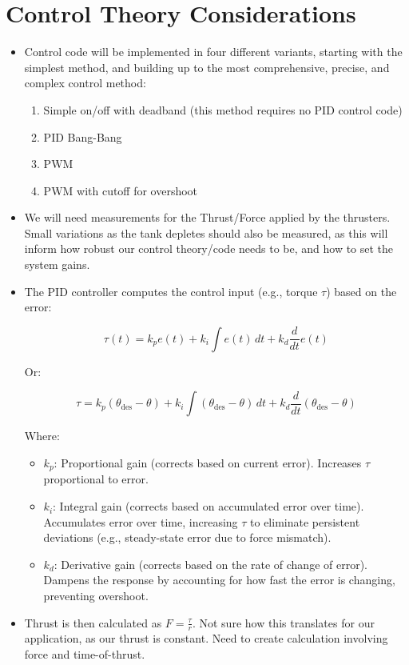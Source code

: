 \documentclass[11pt]{scrartcl}
\begin{document}
\section{Control Theory Considerations}

\begin{itemize}
	\item Control code will be implemented in four different variants, starting with the simplest method, and building up to the most comprehensive, precise, and complex control method:
	\begin{enumerate}
		\item Simple on/off with deadband (this method requires no PID control code)
		\item PID Bang-Bang 
		\item PWM
		\item PWM with cutoff for overshoot
	\end{enumerate}
	
	\item We will need measurements for the Thrust/Force applied by the thrusters. Small variations as the tank depletes should also be measured, as this will inform how robust our control theory/code needs to be, and how to set the system gains.
	
	\item The PID controller computes the control input (e.g., torque \(\tau\)) based on the error: 
	
	\[
	\tau(t) = k_p e(t) + k_i \int e(t)\,dt + k_d \frac{d}{dt} e(t)
	\]
	
	Or:
	
	\[
	\tau = k_p (\theta_{\text{des}} - \theta) + k_i \int (\theta_{\text{des}} - \theta)\,dt + k_d \frac{d}{dt} (\theta_{\text{des}} - \theta)
	\]
	
	Where:
	
	\begin{itemize}
		\item \(k_p\): Proportional gain (corrects based on current error). Increases \(\tau\) proportional to error.
		\item \(k_i\): Integral gain (corrects based on accumulated error over time). Accumulates error over time, increasing \(\tau\) to eliminate persistent deviations (e.g., steady-state error due to force mismatch).
		\item \(k_d\): Derivative gain (corrects based on the rate of change of error). Dampens the response by accounting for how fast the error is changing, preventing overshoot.
	\end{itemize}
	
	\item Thrust is then calculated as \(F = \frac{\tau}{r}\). Not sure how this translates for our application, as our thrust is constant. Need to create calculation involving force and time-of-thrust.
	
	
\end{itemize}
\end{document}
